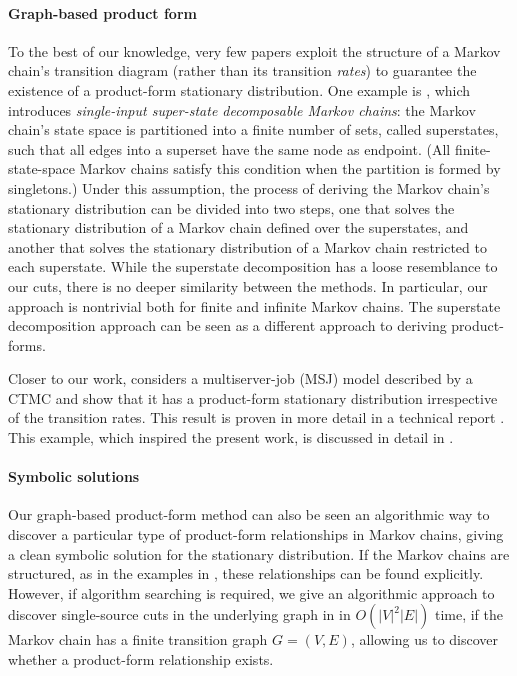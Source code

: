 \paragraph*{Graph-based product form}

To the best of our knowledge,
very few papers exploit the structure
of a Markov chain's transition diagram
(rather than its transition \emph{rates})
to guarantee the existence of a product-form stationary distribution.
One example is \cite{F87}, which introduces
\textit{single-input super-state decomposable Markov chains}:
the Markov chain's state space is partitioned into a finite number of sets,
called superstates,
such that all edges into a superset
have the same node as endpoint.
(All finite-state-space Markov chains satisfy this condition
when the partition is formed by singletons.)
Under this assumption, the process of deriving the Markov chain's stationary distribution
can be divided into two steps,
one that solves the stationary distribution
of a Markov chain defined over the superstates,
and another that solves the stationary distribution
of a Markov chain restricted to each superstate.
While the superstate decomposition has a loose resemblance to our cuts,
there is no deeper similarity between the methods.
In particular,
our approach is nontrivial both for finite and infinite Markov chains.
The superstate decomposition approach can be seen as a different approach to deriving product-forms.

Closer to our work,
\cite{GHS23} considers a multiserver-job (MSJ) model
described by a CTMC
and show that it has a product-form stationary distribution
irrespective of the transition rates.
This result is proven in more detail in a technical report \cite{GHS20}.
This example, which inspired the present work,
is discussed in detail in .



\paragraph*{Symbolic solutions}

Our graph-based product-form method
can also be seen an algorithmic way to discover a particular
type of product-form relationships in Markov chains, giving a clean symbolic solution for the stationary distribution.
If the Markov chains are structured, as in the examples in , these relationships can be found explicitly.
However, if algorithm searching is required, we give an algorithmic approach to discover single-source cuts in the underlying graph in  in $O(|V|^2 |E|)$ time, if the Markov chain has a finite transition graph $G = (V, E)$, allowing us to discover whether a product-form relationship exists.

